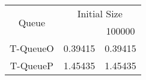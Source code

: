 \begin{tabular}{|c|c|c|}
\hline
\multirow{2}{*}{Queue} & \multicolumn{2}{c|}{Initial Size}\\\cline{2-3}& \qquad 10000 \qquad\quad & 100000\\
\hline
\hline
T-QueueO & 0.39415 & 0.39415\\
T-QueueP & 1.45435 & 1.45435\\
\hline\end{tabular}
